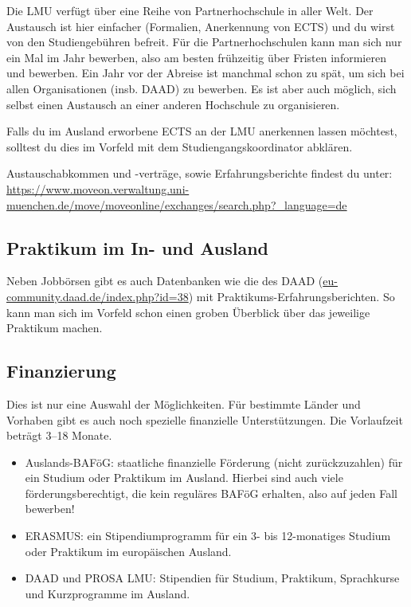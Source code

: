 \documentclass[twoside,12pt,parskip=half-]{scrartcl}
\begin{document}
Die LMU verfügt über eine Reihe von Partnerhochschule in aller
Welt. Der Austausch ist hier einfacher (Formalien, Anerkennung von
ECTS) und du wirst von den Studiengebühren befreit. Für die
Partnerhochschulen kann man sich nur ein Mal im Jahr bewerben, also am
besten frühzeitig über Fristen informieren und bewerben.
Ein Jahr vor der Abreise ist manchmal schon zu spät, um sich bei
allen Organisationen (insb. DAAD) zu bewerben.
Es ist aber auch möglich, sich selbst einen Austausch an einer anderen
Hochschule zu organisieren.

Falls du im Ausland erworbene ECTS an der LMU anerkennen lassen
möchtest, solltest du dies im Vorfeld mit dem Studiengangskoordinator
abklären.

Austauschabkommen und -verträge, sowie Erfahrungsberichte findest du unter:\\
\url{https://www.moveon.verwaltung.uni-muenchen.de/move/moveonline/exchanges/search.php?_language=de}

\subsection{Praktikum im In- und Ausland}

Neben Jobbörsen gibt es auch Datenbanken wie die des DAAD
(\url{eu-community.daad.de/index.php?id=38}) mit
Praktikums-Erfahrungsberichten. So kann man sich im Vorfeld schon
einen groben Überblick über das jeweilige Praktikum machen.

\subsection{Finanzierung}

Dies ist nur eine Auswahl der Möglichkeiten. Für bestimmte Länder und
Vorhaben gibt es auch noch spezielle finanzielle Unterstützungen. Die
Vorlaufzeit beträgt 3--18 Monate.

\begin{itemize}
\item Auslands-BAFöG: staatliche finanzielle Förderung (nicht zurückzuzahlen) für ein Studium oder Praktikum im Ausland. Hierbei sind auch viele förderungsberechtigt, die kein reguläres BAFöG erhalten, also auf jeden Fall bewerben!
\item ERASMUS: ein Stipendiumprogramm für ein 3- bis 12-monatiges Studium oder Praktikum im europäischen Ausland.
\item DAAD und PROSA LMU: Stipendien für Studium, Praktikum, Sprachkurse und Kurzprogramme im Ausland.
\end{itemize}
\end{document}
